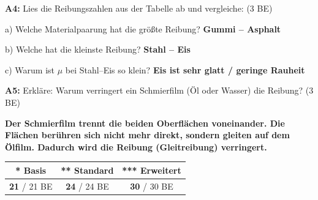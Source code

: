\documentclass[a4paper,11pt]{article}
\newcommand{\stern}[1]{\textcolor{warning}{\textbf{#1}}}
\newcommand{\lsg}[1]{\textcolor{loesung}{\textbf{#1}}}
\begin{document}
\begin{tcolorbox}[colback=white, colframe=warning, boxrule=1pt, arc=0pt,
    title={\textbf{Aufgaben \stern{***}}}, fonttitle=\normalsize, coltitle=black, colbacktitle=white]

\textbf{A4:} Lies die Reibungszahlen aus der Tabelle ab und vergleiche: \hfill (3 BE)

a) Welche Materialpaarung hat die größte Reibung? \lsg{Gummi -- Asphalt}

b) Welche hat die kleinste Reibung? \lsg{Stahl -- Eis}

c) Warum ist $\mu$ bei Stahl--Eis so klein? \lsg{Eis ist sehr glatt / geringe Rauheit}

\textbf{A5:} Erkläre: Warum verringert ein Schmierfilm (Öl oder Wasser) die Reibung? \hfill (3 BE)

\lsg{Der Schmierfilm trennt die beiden Oberflächen voneinander. Die Flächen berühren sich nicht mehr direkt, sondern gleiten auf dem Ölfilm. Dadurch wird die Reibung (Gleitreibung) verringert.}

\end{tcolorbox}

\vspace{3mm}


\begin{center}
\begin{tabular}{|c|c|c|}
\hline
\rowcolor{white}
\textbf{\stern{*} Basis} & \textbf{\stern{**} Standard} & \textbf{\stern{***} Erweitert} \\
\hline
\lsg{21} / 21 BE & \lsg{24} / 24 BE & \lsg{30} / 30 BE \\
\hline
\end{tabular}
\end{center}
\end{document}

